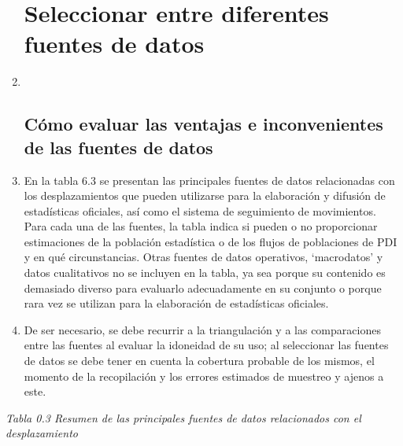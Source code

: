 \documentclass[
]{book}
\begin{document}
\begin{enumerate}
{  \section{Seleccionar entre diferentes fuentes de datos}\label{seleccionar-entre-diferentes-fuentes-de-datos}}
\item ~
  \hypertarget{cuxf3mo-evaluar-las-ventajas-e-inconvenientes-de-las-fuentes-de-datos}{%
  \subsection{Cómo evaluar las ventajas e inconvenientes de las fuentes de datos}\label{cuxf3mo-evaluar-las-ventajas-e-inconvenientes-de-las-fuentes-de-datos}}
\item
  En la tabla 6.3 se presentan las principales fuentes de datos relacionadas con los desplazamientos que pueden utilizarse para la elaboración y difusión de estadísticas oficiales, así como el sistema de seguimiento de movimientos. Para cada una de las fuentes, la tabla indica si pueden o no proporcionar estimaciones de la población estadística o de los flujos de poblaciones de PDI y en qué circunstancias. Otras fuentes de datos operativos, `macrodatos' y datos cualitativos no se incluyen en la tabla, ya sea porque su contenido es demasiado diverso para evaluarlo adecuadamente en su conjunto o porque rara vez se utilizan para la elaboración de estadísticas oficiales.
\item
  De ser necesario, se debe recurrir a la triangulación y a las comparaciones entre las fuentes al evaluar la idoneidad de su uso; al seleccionar las fuentes de datos se debe tener en cuenta la cobertura probable de los mismos, el momento de la recopilación y los errores estimados de muestreo y ajenos a este.
\end{enumerate}

\emph{Tabla 0.3 Resumen de las principales fuentes de datos relacionados con el desplazamiento}
\end{document}
